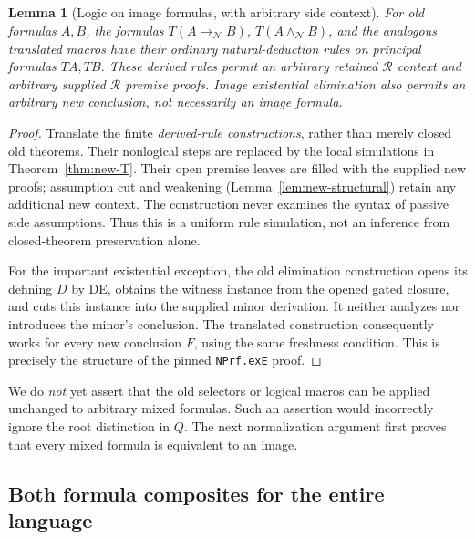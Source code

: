\documentclass[11pt,a4paper]{article}
\newtheorem{lemma}[theorem]{Lemma}
\theoremstyle{definition}\newtheorem{definition}[theorem]{Definition}
\begin{document}
\begin{lemma}[Logic on image formulas, with arbitrary side context]
\label{lem:new-image-logic}
For old formulas $A,B$, the formulas
$T(A\to_{\mathcal N}B)$, $T(A\wedge_{\mathcal N}B)$, and the analogous
translated macros have their ordinary natural-deduction rules on principal
formulas $TA,TB$.  These derived rules permit an arbitrary retained
$\mathcal R$ context and arbitrary supplied $\mathcal R$ premise proofs.
Image existential elimination also permits an arbitrary new conclusion,
not necessarily an image formula.
\end{lemma}
\begin{proof}
Translate the finite \emph{derived-rule constructions}, rather than merely
closed old theorems.  Their nonlogical steps are replaced by the local
simulations in Theorem~\ref{thm:new-T}.  Their open premise leaves are filled
with the supplied new proofs; assumption cut and weakening
(Lemma~\ref{lem:new-structural}) retain any additional new context.  The
construction never examines the syntax of passive side assumptions.
Thus this is a uniform rule simulation, not an inference from
closed-theorem preservation alone.

For the important existential exception, the old elimination construction
opens its defining $D$ by DE, obtains the witness instance from the opened
gated closure, and cuts this instance into the supplied minor derivation.
It neither analyzes nor introduces the minor's conclusion.  The translated
construction consequently works for every new conclusion $F$, using the
same freshness condition.  This is precisely the structure of the pinned
\texttt{NPrf.exE} proof.
\end{proof}

We do \emph{not} yet assert that the old selectors or logical macros can be
applied unchanged to arbitrary mixed formulas.  Such an assertion would
incorrectly ignore the root distinction in $Q$.  The next normalization
argument first proves that every mixed formula is equivalent to an image.

\subsection{Both formula composites for the entire language}
\label{subsec:new-composites}
\end{document}
